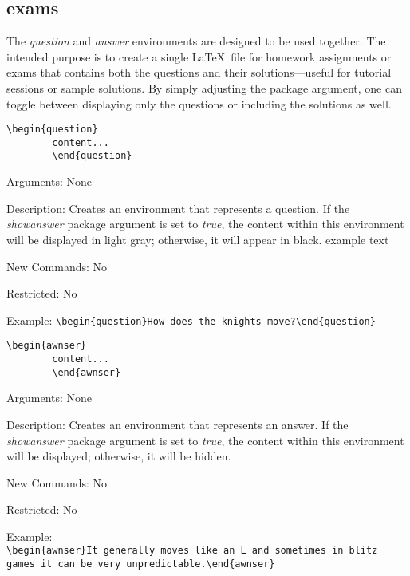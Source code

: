 \documentclass[10pt, a4paper]{article}
\newenvironment{itemizeexamplecommand}{
	\begin{itemize}
		\setlength\itemsep{-0.2em}
	}
	{
	\end{itemize}
}
\begin{document}
	\subsection{exams}
	The \textit{question} and \textit{answer} environments are designed to be used together. The intended purpose is to create a single \LaTeX\ file for homework assignments or exams that contains both the questions and their solutions—useful for tutorial sessions or sample solutions. By simply adjusting the package argument, one can toggle between displaying only the questions or including the solutions as well.
	\pex\begin{itemizeexamplecommand}
		\item[] \begin{lstlisting}[style=B]
		\begin{question}
		content...
		\end{question}
		\end{lstlisting}
		{\scriptsize
			\item[] Arguments: None
			\item[] Description: Creates an environment that represents a question. If the \textit{showanswer} package argument is set to \textit{true}, the content within this environment will be displayed in light gray; otherwise, it will appear in black. \color{fglquestioncolor}example text\color{black}\ 
			\item[] New Commands: No
			\item[] Restricted: No
			\item[] Example: \verb=\begin{question}How does the knights move?\end{question}=}
	\end{itemizeexamplecommand}
	\xe
	\pex\begin{itemizeexamplecommand}
		\item[] \begin{lstlisting}[style=B]
		\begin{awnser}
		content...
		\end{awnser}
		\end{lstlisting}
		{\scriptsize
			\item[] Arguments: None
			\item[] Description: Creates an environment that represents an answer. If the \textit{showanswer} package argument is set to \textit{true}, the content within this environment will be displayed; otherwise, it will be hidden.
			\item[] New Commands: No
			\item[] Restricted: No
			\item[] Example: \\\verb=\begin{awnser}It generally moves like an L and sometimes in blitz games it can be very unpredictable.\end{awnser}=}
	\end{itemizeexamplecommand}
	\xe
\end{document}

